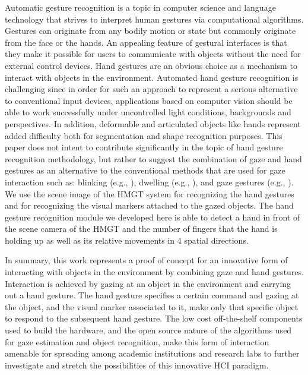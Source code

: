 \documentclass[jou,a4paper,notxfonts]{apa}
\begin{document}
 Automatic gesture recognition is a topic in computer science and language technology that strives to interpret human
 gestures via computational algorithms. Gestures can originate from any bodily motion or state but commonly originate
 from the face or the hands. An appealing feature of gestural interfaces is that they make it possible for users to
 communicate with objects without the need for external control devices. Hand gestures are an obvious choice as a
 mechanism to interact with objects in the environment. Automated hand gesture
 recognition is challenging since in order for such an approach to represent a serious alternative to conventional input
 devices, applications based on computer vision should be able to work successfully under uncontrolled light conditions,
 backgrounds and perspectives. In addition, deformable and articulated objects like hands represent added difficulty
 both for segmentation and shape recognition purposes. This paper does not intent to contribute significantly in the topic of hand gesture recognition methodology, but rather to suggest the combination of gaze and hand gestures as an alternative to the conventional methods that are used for  gaze interaction such as: blinking (e.g., \cite{mackenzie2008eye}), dwelling (e.g., \cite{jacob_use_1991}), and gaze gestures (e.g., \cite{isokoski2000text}). We use the scene image of the HMGT system for recognizing the hand gestures and for recognizing the
 visual markers attached to the gazed objects. The hand gesture recognition module we developed here is able to detect a
 hand in front of the scene camera of the HMGT and the number of fingers that the hand is holding up as well as its relative movements in 4 spatial directions.
 
 In summary, this work represents a proof of concept for an innovative form of interacting with objects in the
 environment by combining gaze and hand gestures. Interaction is achieved by gazing at an object in the environment and
 carrying out a hand gesture. The hand gesture specifies a certain command and gazing at the object, and the visual
 marker associated to it, make only that specific object to respond to the subsequent hand gesture. The low cost off-the-shelf
 components used to build the hardware, and the open source nature of the algorithms used for gaze estimation and object recognition, make this form of interaction amenable for spreading among academic institutions and research labs to further investigate and stretch the possibilities of this innovative HCI paradigm.
\end{document}
